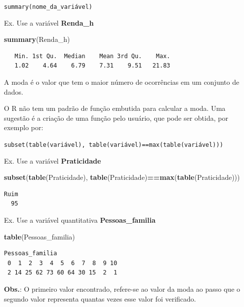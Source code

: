 \documentclass[12pt,portuguese,oneside]{book}
\newenvironment{Shaded}{\begin{snugshade}}{\end{snugshade}}
\newcommand{\KeywordTok}[1]{\textcolor[rgb]{0.13,0.29,0.53}{\textbf{#1}}}
\newcommand{\OperatorTok}[1]{\textcolor[rgb]{0.81,0.36,0.00}{\textbf{#1}}}
\newcommand{\NormalTok}[1]{#1}
\begin{document}
\texttt{summary(nome\_da\_variável)}

Ex. Use a variável \textbf{Renda\_h}

\begin{Shaded}
\begin{Highlighting}[]
\KeywordTok{summary}\NormalTok{(Renda_h)}
\end{Highlighting}
\end{Shaded}

\begin{verbatim}
   Min. 1st Qu.  Median    Mean 3rd Qu.    Max. 
   1.02    4.64    6.79    7.31    9.51   21.83 
\end{verbatim}

A moda é o valor que tem o maior número de ocorrências em um conjunto de
dados.

O R não tem um padrão de função embutida para calcular a moda. Uma
sugestão é a criação de uma função pelo usuário, que pode ser obtida,
por exemplo por:

\texttt{subset(table(variável),\ table(variável)==max(table(variável)))}

Ex. Use a variável \textbf{Praticidade}

\begin{Shaded}
\begin{Highlighting}[]
\KeywordTok{subset}\NormalTok{(}\KeywordTok{table}\NormalTok{(Praticidade), }
       \KeywordTok{table}\NormalTok{(Praticidade)}\OperatorTok{==}\KeywordTok{max}\NormalTok{(}\KeywordTok{table}\NormalTok{(Praticidade)))}
\end{Highlighting}
\end{Shaded}

\begin{verbatim}
Ruim 
  95 
\end{verbatim}

Ex. Use a variável quantitativa \textbf{Pessoas\_familia}

\begin{Shaded}
\begin{Highlighting}[]
\KeywordTok{table}\NormalTok{(Pessoas_familia)}
\end{Highlighting}
\end{Shaded}

\begin{verbatim}
Pessoas_familia
 0  1  2  3  4  5  6  7  8  9 10 
 2 14 25 62 73 60 64 30 15  2  1 
\end{verbatim}

\textbf{Obs.}: O primeiro valor encontrado, refere-se ao valor da moda
ao passo que o segundo valor representa quantas vezes esse valor foi
verificado.
\end{document}
